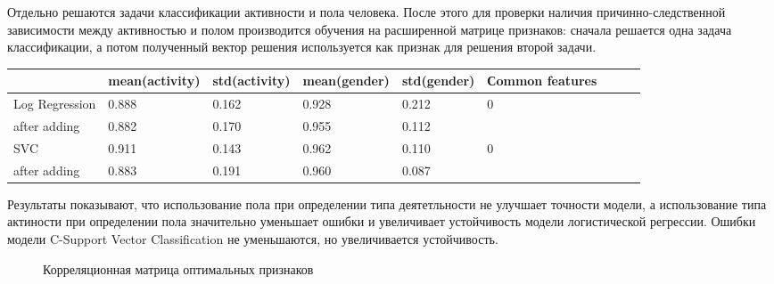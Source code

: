 \documentclass[12pt, twoside]{article}
\begin{document}
Отдельно решаются задачи классификации активности и пола человека. После этого для проверки наличия причинно-следственной зависимости между активностью и полом производится обучения на расширенной матрице признаков: сначала решается одна задача классификации, а потом полученный вектор решения используется как признак для решения второй задачи.

\begin{table}[H]
\caption{Среднее и дисперсия верных классификаций при кросс-валидации}
\begin{table}[H]
\begin{tabular}{|l|l|l|l|l|l|l|l|l|}
\hline
               & mean(activity)   & std(activity) & mean(gender) & std(gender) & Сommon features\\ \hline
Log Regression & 0.888 & 0.162 & 0.928  & 0.212    & 0 \\
after adding   & 0.882 & 0.170 & 0.955  & 0.112    &     \\ \hline
SVC            & 0.911 & 0.143 & 0.962  & 0.110    & 0 \\
after adding   & 0.883 & 0.191 & 0.960  & 0.087    & \\ \hline
\end{tabular}
\end{table}

\end{table}

Результаты показывают, что использование пола при определении типа деятетльности не улучшает точности модели, а использование типа актиности при определении пола значительно уменьшает ошибки и увеличивает устойчивость модели логистической регрессии. Ошибки модели C-Support Vector Classification не уменьшаются, но увеличивается устойчивость.

\begin{figure}[H]
\caption{ Корреляционная матрица оптимальных признаков}
\label{fig:image}
\end{figure}
\end{document}
